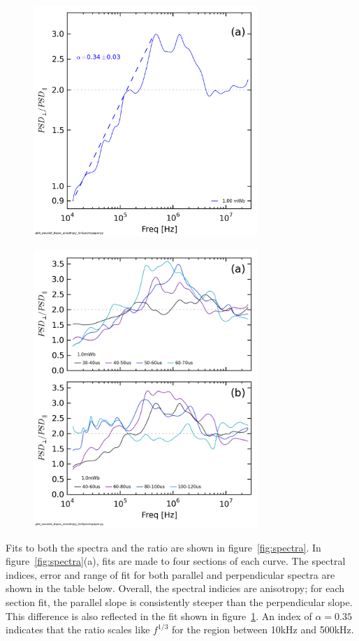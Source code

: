 \documentclass[aip,prl,amsmath,amssymb,reprint,superscriptaddress]{revtex4-1} %
\begin{document}
\begin{figure}[!htbp]
\centerline{
\includegraphics[width=8.5cm]{Bperppara_chan1t4_1mWbspectra_40t60us_AsymRatio_wFit}}
\caption{\label{fig:fitratio}}
\end{figure}

\begin{figure}[!htbp]
\centerline{
\includegraphics[width=8.5cm]{Bperppara_chan1t4_1mWbspectra_timescan}}
\caption{\label{fig:timeratio}}
\end{figure}

Fits to both the spectra and the ratio are shown in figure~\ref{fig:spectra}. In figure~\ref{fig:spectra}(a), fits are made to four sections of each curve. The spectral indices, error and range of fit for both parallel and perpendicular spectra are shown in the table below. Overall, the spectral indicies are anisotropy; for each section fit, the parallel slope is consistently steeper than the perpendicular slope. This difference is also reflected in the fit shown in figure~\ref{fig:fitratio}. An index of $\alpha = 0.35$ indicates that the ratio scales like $f^{1/3}$ for the region between 10kHz and 500kHz.
\end{document}
